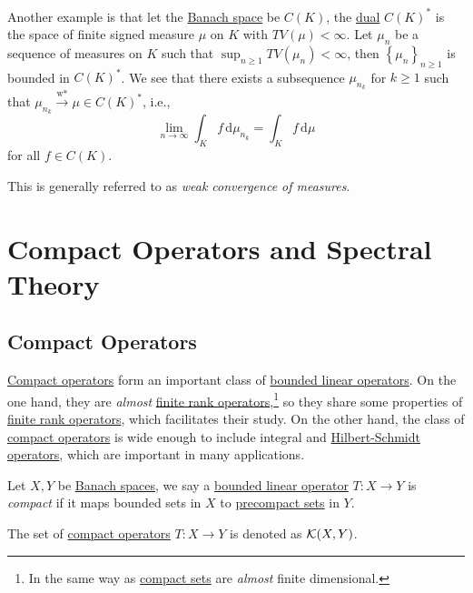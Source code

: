 Another example is that let the \hyperref[def:Banach-space]{Banach space} be \(C(K)\), the \hyperref[def:dual-space]{dual} \(C(K)^{\ast} \) is the space of finite signed measure \(\mu\) on \(K\) with \(TV(\mu )< \infty \). Let \(\mu _n\) be a sequence of measures on \(K\) such that \(\sup _{n\geq 1} TV(\mu _n) < \infty \), then \(\left\{ \mu _n \right\}_{n\geq 1} \) is bounded in \(C(K)^{\ast} \). We see that there exists a subsequence \(\mu _{n_k}\) for \(k\geq 1\) such that \(\mu _{n_k}\overset{\text{w*}}{\to } \mu \in C(K)^{\ast} \), i.e.,
\[
	\lim_{n \to \infty} \int _K f\,\mathrm{d} \mu _{n_k} = \int _K f\,\mathrm{d} \mu
\]
for all \(f\in C(K)\).

\begin{note}
	This is generally referred to as \emph{weak convergence of measures}.
\end{note}

\chapter{Compact Operators and Spectral Theory}

\section{Compact Operators}
\hyperref[def:compact-op]{Compact operators} form an important class of \hyperref[def:bounded-linear-op]{bounded linear operators}. On the one hand, they are \emph{almost} \hyperref[rmk:finite-rank-op]{finite rank operators},\footnote{In the same way as \hyperref[def:compact]{compact sets} are \emph{almost} finite dimensional.} so they share some properties of \hyperref[rmk:finite-rank-op]{finite rank operators}, which facilitates their study. On the other hand, the class of \hyperref[def:compact-op]{compact operators} is wide enough to include integral and \hyperref[def:Hilbert-Schmidt-op]{Hilbert-Schmidt operators}, which are important in many applications.

\begin{definition}\label{def:compact-op}
	Let \(X, Y\) be \hyperref[def:Banach-space]{Banach spaces}, we say a \hyperref[def:bounded-linear-op]{bounded linear operator} \(T\colon X\to Y\) is \emph{compact} if it maps bounded sets in \(X\) to \hyperref[def:precompact]{precompact sets} in \(Y\).
\end{definition}

\begin{notation}
	The set of \hyperref[def:compact-op]{compact operators} \(T\colon X\to Y\) is denoted as \(\mathcal{\MakeUppercase{K}} (X, Y)\).
\end{notation}

